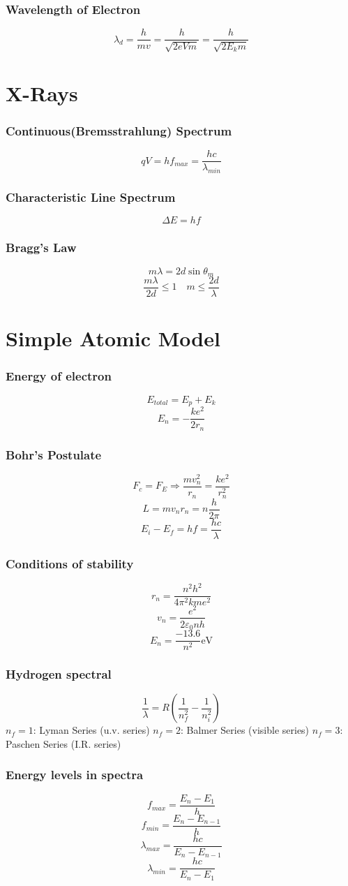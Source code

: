 \documentclass{article}
\begin{document}
\subsubsection*{Wavelength of Electron}
\[\lambda_d=\frac{h}{mv}=\frac{h}{\sqrt{2eVm}}=\frac{h}{\sqrt{2E_km}}\]

\section{X-Rays}
\subsubsection*{Continuous(Bremsstrahlung) Spectrum}
\[qV=hf_{max}=\frac{hc}{\lambda_{min}}\]

\subsubsection*{Characteristic Line Spectrum}
\[\Delta E=hf\]

\subsubsection*{Bragg's Law}
\[m\lambda=2d\sin\theta_m\]
\[\frac{m\lambda}{2d}\leq 1\quad m\leq\frac{2d}{\lambda}\]

\section{Simple Atomic Model}
\subsubsection*{Energy of electron}
\[E_{total}=E_p+E_k\]
\[E_n=-\frac{ke^2}{2r_n}\]

\subsubsection{Bohr's Postulate}
\[F_c=F_E \Rightarrow \frac{mv_n^2}{r_n}=\frac{ke^2}{r_n^2}\]
\[L=mv_nr_n=n\frac{h}{2\pi}\]
\[E_i-E_f=hf=\frac{hc}{\lambda}\]

\subsubsection*{Conditions of stability}
\[r_n=\frac{n^2h^2}{4\pi^2kme^2}\]
\[v_n=\frac{e^2}{2 \varepsilon_0 nh}\]
\[E_n=\frac{-13.6}{n^2}\mathrm{eV}\]

\subsubsection*{Hydrogen spectral}
\[\frac{1}{\lambda}=R(\frac{1}{n^2_f}-\frac{1}{n^2_i})\]
\(n_f=1\): Lyman Series (u.v. series)
\(n_f=2\): Balmer Series (visible series)
\(n_f=3\): Paschen Series (I.R. series)

\subsubsection*{Energy levels in spectra}
\[f_{max}=\frac{E_n-E_1}{h}\]
\[f_{min}=\frac{E_n-E_{n-1}}{h}\]
\[\lambda_{max}=\frac{hc}{E_n-E_{n-1}}\]
\[\lambda_{min}=\frac{hc}{E_n-E_1}\]
\end{document}
